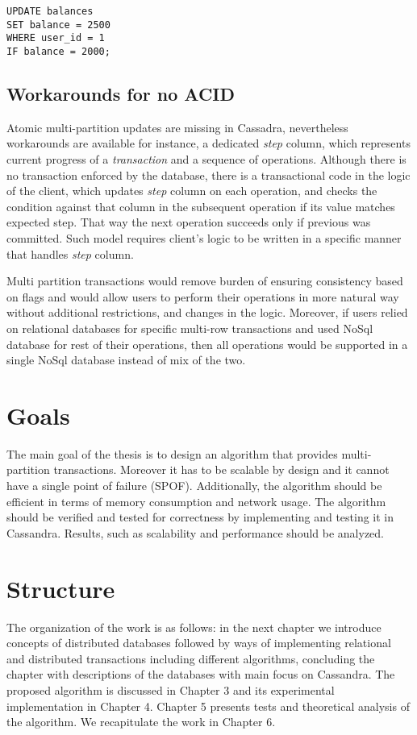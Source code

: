 \begin{example}
\label{lst:intro:lwtUpdate}
\begin{lstlisting}[style=outcode,caption={LWT Update with column condition}]
UPDATE balances 
SET balance = 2500 
WHERE user_id = 1
IF balance = 2000;
\end{lstlisting}
\end{example}


\subsection{Workarounds for no ACID}
Atomic multi-partition updates are missing in Cassadra, nevertheless workarounds are available for instance, a dedicated \emph{step} column, which represents current progress of a \emph{transaction} and a sequence of \lwt operations. Although there is no transaction enforced by the database, there is a transactional code in the logic of the client, which updates \emph{step} column on each operation, and checks the condition against that column in the subsequent operation if its value matches expected step. That way the next operation succeeds only if previous was committed. 
Such model requires client's logic to be written in a specific manner that handles \emph{step} column. 

Multi partition transactions would remove burden of ensuring consistency based on flags and would allow users to perform their operations in more natural way without additional restrictions, and changes in the logic. Moreover, if users relied on relational databases for specific multi-row transactions and used NoSql database for rest of their operations, then all operations would be supported in a single NoSql database instead of mix of the two.

\section{Goals}
The main goal of the thesis is to design an algorithm that provides multi-partition transactions. Moreover it has to be scalable by design and it cannot have a single point of failure (SPOF). Additionally, the algorithm should be efficient in terms of memory consumption and network usage. The algorithm should be verified and tested for correctness by implementing and testing it in Cassandra. Results, such as scalability and performance should be analyzed.

 
\section{Structure}\label{sec:introduction:structure}
The organization of the work is as follows: 
in the next chapter we introduce concepts of distributed databases followed by ways of implementing relational and distributed transactions including different algorithms, concluding the chapter with descriptions of the databases with main focus on Cassandra. 
The proposed algorithm is discussed in Chapter 3 and its experimental implementation in Chapter 4.
Chapter 5 presents tests and theoretical analysis of the algorithm.
We recapitulate the work in Chapter 6.

